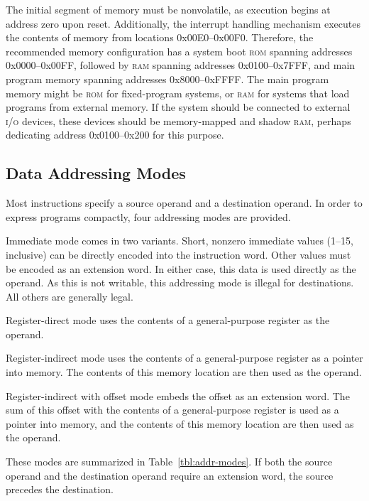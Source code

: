 \documentclass[12pt,english]{book}
\begin{document}
The initial segment of memory must be nonvolatile,
as execution begins at address zero upon reset.
Additionally, the interrupt handling mechanism
executes the contents of memory from locations 0x00E0--0x00F0.
Therefore, the recommended memory configuration
has a system boot \textsc{rom} spanning addresses 0x0000--0x00FF,
followed by \textsc{ram} spanning addresses 0x0100--0x7FFF,
and main program memory spanning addresses 0x8000--0xFFFF.
The main program memory might be \textsc{rom} for fixed-program systems,
or \textsc{ram} for systems that load programs from external memory.
If the system should be connected to external \textsc{i/o} devices,
these devices should be memory-mapped and shadow \textsc{ram},
perhaps dedicating address 0x0100--0x200 for this purpose.

\subsection{Data Addressing Modes}
Most instructions specify a source operand
and a destination operand.
In order to express programs compactly,
four addressing modes are provided.

Immediate mode comes in two variants.
Short, nonzero immediate values (1--15, inclusive)
can be directly encoded into the instruction word.
Other values must be encoded as an extension word.
In either case, this data is used directly as the operand.
As this is not writable,
this addressing mode is illegal for destinations.
All others are generally legal.

Register-direct mode uses the contents of a general-purpose register
as the operand.

Register-indirect mode uses the contents of a general-purpose register
as a pointer into memory.
The contents of this memory location are then used as the operand.

Register-indirect with offset mode
embeds the offset as an extension word.
The sum of this offset with the contents of a general-purpose register
is used as a pointer into memory,
and the contents of this memory location are then used as the operand.

These modes are summarized in Table~\ref{tbl:addr-modes}.
If both the source operand and the destination operand
require an extension word,
the source precedes the destination.
\end{document}
